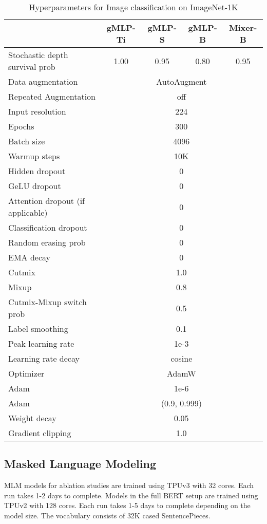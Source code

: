 \documentclass{article}
\newcommand{\gffn}{gMLP\xspace}
\begin{document}
\begin{table}[h]
\centering
\begin{tabular}{@{}l|cccc@{}}
\toprule
 & \gffn-Ti & \gffn-S & \gffn-B & Mixer-B \\ \midrule
Stochastic depth survival prob & 1.00 & 0.95 & 0.80 & 0.95 \\
\midrule
Data augmentation & \multicolumn{4}{c}{AutoAugment} \\
Repeated Augmentation & \multicolumn{4}{c}{off} \\
Input resolution & \multicolumn{4}{c}{224} \\
Epochs & \multicolumn{4}{c}{300} \\
Batch size & \multicolumn{4}{c}{4096} \\
Warmup steps & \multicolumn{4}{c}{10K} \\
Hidden dropout & \multicolumn{4}{c}{0} \\
GeLU dropout & \multicolumn{4}{c}{0} \\
Attention dropout (if applicable) & \multicolumn{4}{c}{0} \\
Classification dropout & \multicolumn{4}{c}{0} \\
Random erasing prob & \multicolumn{4}{c}{0} \\
EMA decay & \multicolumn{4}{c}{0} \\
Cutmix  & \multicolumn{4}{c}{1.0} \\
Mixup  & \multicolumn{4}{c}{0.8} \\
Cutmix-Mixup switch prob & \multicolumn{4}{c}{0.5} \\
Label smoothing & \multicolumn{4}{c}{0.1} \\
Peak learning rate & \multicolumn{4}{c}{1e-3} \\
Learning rate decay & \multicolumn{4}{c}{cosine} \\
Optimizer & \multicolumn{4}{c}{AdamW} \\
Adam  & \multicolumn{4}{c}{1e-6} \\
Adam  & \multicolumn{4}{c}{(0.9, 0.999)} \\
Weight decay & \multicolumn{4}{c}{0.05} \\
Gradient clipping & \multicolumn{4}{c}{1.0} \\
\bottomrule
\end{tabular}
\caption{Hyperparameters for Image classification on ImageNet-1K}
\end{table}

\FloatBarrier
\subsection{Masked Language Modeling}
\label{sec:mlm-hparams}
MLM models for ablation studies are trained using TPUv3 with 32 cores. Each run takes 1-2 days to complete. Models in the full BERT setup are trained using TPUv2 with 128 cores. Each run takes 1-5 days to complete depending on the model size. The vocabulary consists of 32K cased SentencePieces.
\end{document}
